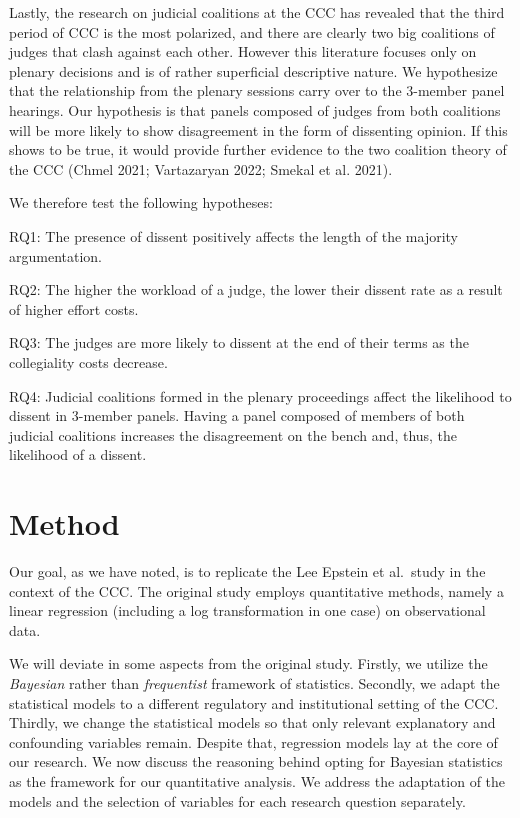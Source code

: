 \documentclass[
  11pt,
]{article}
\begin{document}
Lastly, the research on judicial coalitions at the CCC has revealed that
the third period of CCC is the most polarized, and there are clearly two
big coalitions of judges that clash against each other. However this
literature focuses only on plenary decisions and is of rather
superficial descriptive nature. We hypothesize that the relationship
from the plenary sessions carry over to the 3-member panel hearings. Our
hypothesis is that panels composed of judges from both coalitions will
be more likely to show disagreement in the form of dissenting opinion.
If this shows to be true, it would provide further evidence to the two
coalition theory of the CCC (Chmel 2021; Vartazaryan 2022; Smekal et al.
2021).

We therefore test the following hypotheses:

RQ1: The presence of dissent positively affects the length of the
majority argumentation.

RQ2: The higher the workload of a judge, the lower their dissent rate as
a result of higher effort costs.

RQ3: The judges are more likely to dissent at the end of their terms as
the collegiality costs decrease.

RQ4: Judicial coalitions formed in the plenary proceedings affect the
likelihood to dissent in 3-member panels. Having a panel composed of
members of both judicial coalitions increases the disagreement on the
bench and, thus, the likelihood of a dissent.

\hypertarget{method}{%
\section{Method}\label{method}}

Our goal, as we have noted, is to replicate the Lee Epstein et al.~study
in the context of the CCC. The original study employs quantitative
methods, namely a linear regression (including a log transformation in
one case) on observational data.

We will deviate in some aspects from the original study. Firstly, we
utilize the \emph{Bayesian} rather than \emph{frequentist} framework of
statistics. Secondly, we adapt the statistical models to a different
regulatory and institutional setting of the CCC. Thirdly, we change the
statistical models so that only relevant explanatory and confounding
variables remain. Despite that, regression models lay at the core of our
research. We now discuss the reasoning behind opting for Bayesian
statistics as the framework for our quantitative analysis. We address
the adaptation of the models and the selection of variables for each
research question separately.
\end{document}
